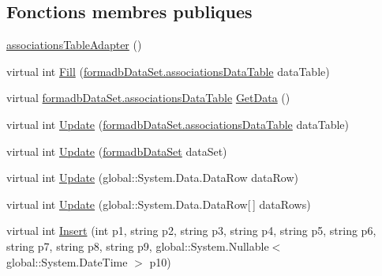 \subsection*{Fonctions membres publiques}
\begin{DoxyCompactItemize}
\item 
\hyperlink{classforma_1_1formadb_data_set_table_adapters_1_1associations_table_adapter_aeecbde6b2e3f6b351bf792431e7c8bd5}{associations\+Table\+Adapter} ()
\item 
virtual int \hyperlink{classforma_1_1formadb_data_set_table_adapters_1_1associations_table_adapter_a09a2ba9af109a65006006168b7046c19}{Fill} (\hyperlink{classforma_1_1formadb_data_set_1_1associations_data_table}{formadb\+Data\+Set.\+associations\+Data\+Table} data\+Table)
\item 
virtual \hyperlink{classforma_1_1formadb_data_set_1_1associations_data_table}{formadb\+Data\+Set.\+associations\+Data\+Table} \hyperlink{classforma_1_1formadb_data_set_table_adapters_1_1associations_table_adapter_a68339de1d52c30cd7dedaa0d2c06b771}{Get\+Data} ()
\item 
virtual int \hyperlink{classforma_1_1formadb_data_set_table_adapters_1_1associations_table_adapter_aa8a8af07e2e6e2f614e4f6aa3660ab07}{Update} (\hyperlink{classforma_1_1formadb_data_set_1_1associations_data_table}{formadb\+Data\+Set.\+associations\+Data\+Table} data\+Table)
\item 
virtual int \hyperlink{classforma_1_1formadb_data_set_table_adapters_1_1associations_table_adapter_aa062c10e98e1ea26700713b649b9574b}{Update} (\hyperlink{classforma_1_1formadb_data_set}{formadb\+Data\+Set} data\+Set)
\item 
virtual int \hyperlink{classforma_1_1formadb_data_set_table_adapters_1_1associations_table_adapter_a0723395743c012eec32dad620663ec27}{Update} (global\+::\+System.\+Data.\+Data\+Row data\+Row)
\item 
virtual int \hyperlink{classforma_1_1formadb_data_set_table_adapters_1_1associations_table_adapter_a506791851b1d19b215b7243368525fcb}{Update} (global\+::\+System.\+Data.\+Data\+Row\mbox{[}$\,$\mbox{]} data\+Rows)
\item 
virtual int \hyperlink{classforma_1_1formadb_data_set_table_adapters_1_1associations_table_adapter_a07605aae19a99c6deacd6a3ab1b5c70b}{Insert} (int p1, string p2, string p3, string p4, string p5, string p6, string p7, string p8, string p9, global\+::\+System.\+Nullable$<$ global\+::\+System.\+Date\+Time $>$ p10)
\end{DoxyCompactItemize}
